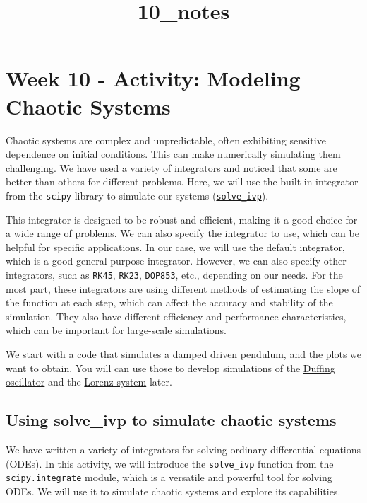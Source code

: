 \documentclass[11pt]{article}
\title{10\_notes}
\begin{document}
    
    \maketitle
    
    

    
    \section{Week 10 - Activity: Modeling Chaotic
Systems}\label{week-10---activity-modeling-chaotic-systems}

Chaotic systems are complex and unpredictable, often exhibiting
sensitive dependence on initial conditions. This can make numerically
simulating them challenging. We have used a variety of integrators and
noticed that some are better than others for different problems. Here,
we will use the built-in integrator from the \texttt{scipy} library to
simulate our systems
(\href{https://docs.scipy.org/doc/scipy/reference/generated/scipy.integrate.solve_ivp.html}{\texttt{solve\_ivp}}).

This integrator is designed to be robust and efficient, making it a good
choice for a wide range of problems. We can also specify the integrator
to use, which can be helpful for specific applications. In our case, we
will use the default integrator, which is a good general-purpose
integrator. However, we can also specify other integrators, such as
\texttt{RK45}, \texttt{RK23}, \texttt{DOP853}, etc., depending on our
needs. For the most part, these integrators are using different methods
of estimating the slope of the function at each step, which can affect
the accuracy and stability of the simulation. They also have different
efficiency and performance characteristics, which can be important for
large-scale simulations.

We start with a code that simulates a damped driven pendulum, and the
plots we want to obtain. You will can use those to develop simulations
of the \href{https://en.wikipedia.org/wiki/Duffing_equation}{Duffing
oscillator} and the
\href{https://en.wikipedia.org/wiki/Lorenz_system}{Lorenz system} later.

    \subsection{Using solve\_ivp to simulate chaotic
systems}\label{using-solve_ivp-to-simulate-chaotic-systems}

We have written a variety of integrators for solving ordinary
differential equations (ODEs). In this activity, we will introduce the
\texttt{solve\_ivp} function from the \texttt{scipy.integrate} module,
which is a versatile and powerful tool for solving ODEs. We will use it
to simulate chaotic systems and explore its capabilities.
\end{document}
